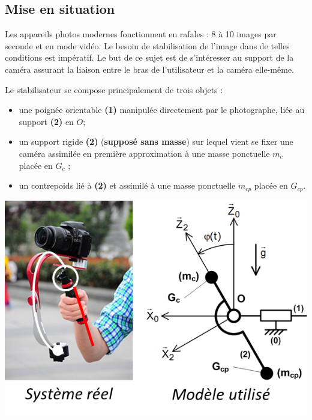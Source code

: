\documentclass[10pt,fleqn]{article} %
\begin{document}
\def\pathfig{images}

\vspace{5cm}
\pagestyle{fancy}
\thispagestyle{plain}

\def\columnseprulecolor{\color{ocre}}
\setlength{\columnseprule}{0.4pt} 

\def\pathfig{images}

\ifprof
\else
\begin{multicols}{2}
\fi

\subsection*{Mise en situation}

Les appareils photos modernes fonctionnent en rafales : 8 à 10 images par seconde et en mode vidéo. Le besoin de
stabilisation de l’image dans de telles conditions est impératif. Le but de ce sujet est de s’intéresser au support de la caméra assurant la liaison entre le bras de l'utilisateur et la caméra elle-même.

Le stabilisateur se compose principalement de trois objets :
\begin{itemize}
\item une poignée orientable \textbf{(1)} manipulée directement par le photographe, liée au support \textbf{(2)} en $O$;
\item un support rigide \textbf{(2)} (\textbf{supposé sans masse}) sur lequel vient se fixer une caméra assimilée en première approximation à une masse ponctuelle $m_c$ placée en $G_c$ ;
\item un contrepoids lié à \textbf{(2)} et assimilé à une masse ponctuelle $m_{cp}$ placée en $G_{cp}$.
\end{itemize}

\begin{center}
\includegraphics[width=.7\linewidth]{images/fig_01}
\end{center}


\end{multicols}
\end{document}
